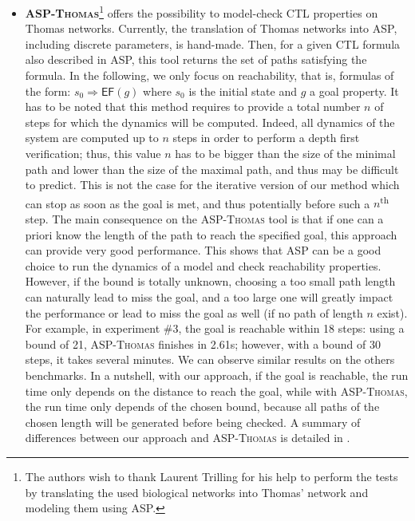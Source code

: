\begin{itemize}[leftmargin=*]
\item \textbf{\textsc{ASP-Thomas}}\footnote{The authors wish to thank Laurent Trilling for his help to perform the tests by translating the used biological networks into Thomas' network and modeling them using ASP. }
offers the possibility to model-check CTL properties on Thomas networks.
Currently, the translation of Thomas networks into ASP, including discrete parameters, is hand-made.
Then, for a given CTL formula also described in ASP, this tool returns the set of paths satisfying the formula.
In the following, we only focus on reachability, that is, formulas of the form: $s_0 \Rightarrow \mathsf{EF}(g)$
where $s_0$ is the initial state and $g$ a goal property.
It has to be noted that this method requires to provide a total number $n$ of steps
for which the dynamics will be computed.
Indeed, all dynamics of the system are computed up to $n$ steps in order to perform a depth first verification;
thus, this value $n$ has to be bigger than the size of the minimal path and lower than the size of the maximal path,
and thus may be difficult to predict.
This is not the case for the iterative version of our method which can stop as soon as the goal is met,
and thus potentially before such a $n$\textsuperscript{th} step.
The main consequence on the \textsc{ASP-Thomas} tool
is that if one can a priori know the length of the path to reach the specified goal,
this approach can provide very good performance.
This shows that ASP can be a good choice to run the dynamics of a model and check reachability properties.
However, if the bound is totally unknown, choosing a too small path length can naturally lead to miss the goal,
and a too large one will greatly impact the performance or lead to miss the goal as well (if no path of length $n$ exist).
For example, in experiment \#3, the goal is reachable within 18 steps:
using a bound of 21, \textsc{ASP-Thomas} finishes in 2.61s;
however, with a bound of 30 steps, it takes several minutes.
We can observe similar results on the others benchmarks.
In a nutshell, with our approach, if the goal is reachable, the run time only depends on the distance to reach the goal,
while with \textsc{ASP-Thomas}, the run time only depends of the chosen bound,
because all paths of the chosen length will be generated before being checked.
A summary of differences between our approach and \textsc{ASP-Thomas} is detailed in .

\end{itemize}
